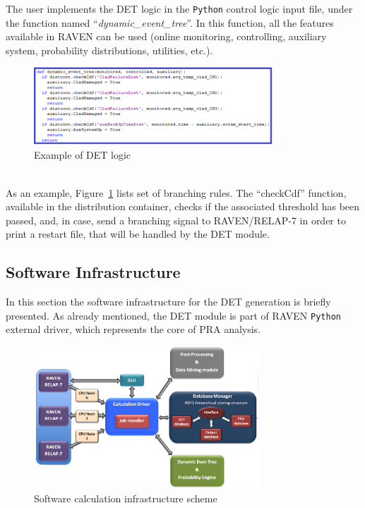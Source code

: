 The user implements the DET logic in the \verb!Python! control logic input file, under the function named ``\emph{dynamic\_event\_tree}''. In this function, all the features available in RAVEN can be used (online monitoring, controlling, auxiliary system, probability distributions, utilities, etc.). 
\begin{figure}[h] 
  \centering
     \includegraphics[width=0.8\textwidth]{figures/BranchingLaws.png}
  \caption{Example of DET logic}
   \label{fig:DET_branchLaws}
\end{figure}
\\As an example, Figure~\ref{fig:DET_branchLaws} lists set of branching rules. The ``checkCdf'' function, available in the distribution container, checks if the associated threshold has been passed, and, in case, send a branching signal to RAVEN/RELAP-7 in order to print a restart file, that will be handled by the DET module. 
\subsection{Software Infrastructure} 
\label{sec:CPUInfrastructure}
In this section the software infrastructure for the DET generation is briefly presented. As already mentioned, the DET module is part of RAVEN \verb!Python! external driver, which represents the core of PRA analysis.
\begin{figure}[h] 
  \centering
     \includegraphics[width=0.75\textwidth]{figures/softwareCalcStructure.png}
  \caption{Software calculation infrastructure scheme}
   \label{fig:softwareInfrastructure}
\end{figure} 


